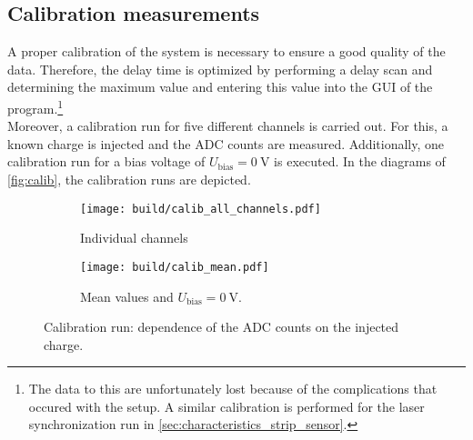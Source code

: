 \subsection{Calibration measurements}
\label{sec:analysis_calib}
A proper calibration of the system is necessary to ensure a good quality of the data. Therefore, the delay time is optimized by performing a delay scan and determining
the maximum value and entering this value into the GUI of the program.\footnote{The data to this are unfortunately lost because of the complications that occured with the setup.
A similar calibration is performed for the laser synchronization run in \autoref{sec:characteristics_strip_sensor}.}\\
Moreover, a calibration run for five different channels is carried out. For this, a known charge is injected and the ADC counts are measured. Additionally, one
calibration run for a bias voltage of $U_{\mathrm{bias}}=\qty{0}{\volt}$ is executed. In the diagrams of \autoref{fig:calib}, the calibration runs are depicted.

\begin{figure}
    \centering
    \begin{subfigure}{0.6\textwidth}
        \texttt{[image: build/calib\_all\_channels.pdf]}
        \caption{Individual channels}
        \label{fig:calib_all_channels}
    \end{subfigure}
    \hfill
    \begin{subfigure}{0.6\textwidth}
        \texttt{[image: build/calib\_mean.pdf]}
        \caption{Mean values and $U_{\mathrm{bias}}=\qty{0}{\volt}$.}
        \label{fig:calib_mean}
    \end{subfigure}
    \caption{Calibration run: dependence of the ADC counts on the injected charge.}
    \label{fig:calib}
\end{figure}

